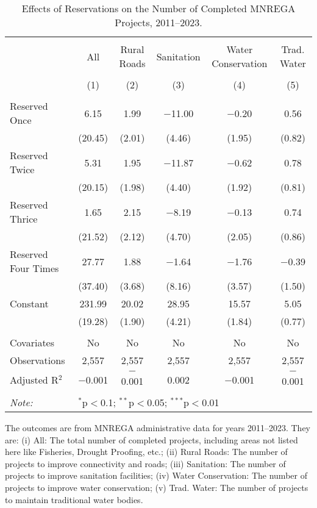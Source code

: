 \begin{table}[!htbp]
\centering
\begin{threeparttable}

  \caption{Effects of Reservations on the Number of Completed MNREGA Projects, 2011--2023.} 
  \label{main_mnrega_2011_2023_dosage} 
\scriptsize 
\begin{tabular}{@{\extracolsep{0pt}}lccccc} 
\\[-1.8ex]\hline 
\hline \\[-1.8ex] 
 & All & Rural Roads & Sanitation & Water Conservation & Trad. Water \\ 
\\[-1.8ex] & (1) & (2) & (3) & (4) & (5)\\ 
\hline \\[-1.8ex] 
 Reserved Once & 6.15 & 1.99 & $-$11.00 & $-$0.20 & 0.56 \\ 
  & (20.45) & (2.01) & (4.46) & (1.95) & (0.82) \\ 
  Reserved Twice & 5.31 & 1.95 & $-$11.87 & $-$0.62 & 0.78 \\ 
  & (20.15) & (1.98) & (4.40) & (1.92) & (0.81) \\ 
  Reserved Thrice & 1.65 & 2.15 & $-$8.19 & $-$0.13 & 0.74 \\ 
  & (21.52) & (2.12) & (4.70) & (2.05) & (0.86) \\ 
  Reserved Four Times & 27.77 & 1.88 & $-$1.64 & $-$1.76 & $-$0.39 \\ 
  & (37.40) & (3.68) & (8.16) & (3.57) & (1.50) \\ 
  Constant & 231.99 & 20.02 & 28.95 & 15.57 & 5.05 \\ 
  & (19.28) & (1.90) & (4.21) & (1.84) & (0.77) \\ 
 \hline \\[-1.8ex] 
Covariates & No & No & No & No & No \\ 
Observations & 2,557 & 2,557 & 2,557 & 2,557 & 2,557 \\ 
Adjusted R$^{2}$ & $-$0.001 & $-$0.001 & 0.002 & $-$0.001 & $-$0.001 \\ 
\hline 
\hline \\[-1.8ex] 
\textit{Note:}  & \multicolumn{5}{l}{$^{*}$p$<$0.1; $^{**}$p$<$0.05; $^{***}$p$<$0.01} \\ 
\end{tabular} 
\begin{tablenotes}[flushleft]
\scriptsize
\item The outcomes are from MNREGA administrative data for years 2011--2023. They are: 
(i) All: The total number of completed projects, including areas not listed here like Fisheries, Drought Proofing, etc.;
(ii) Rural Roads: The number of projects to improve connectivity and roads;
(iii) Sanitation: The number of projects to improve sanitation facilities;
(iv) Water Conservation: The number of projects to improve water conservation;
(v) Trad. Water: The number of projects to maintain traditional water bodies.
\end{tablenotes}
\end{threeparttable}
\end{table}
